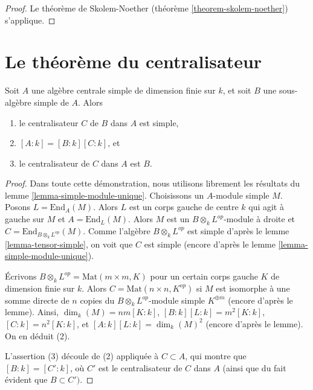 \begin{proof}
Le théorème de Skolem-Noether (théorème \ref{theorem-skolem-noether})
s'applique.
\end{proof}



\section{Le théorème du centralisateur}
\label{section-centralizer}


\begin{theorem}
\label{theorem-centralizer}
Soit $A$ une algèbre centrale simple de dimension finie sur $k$, et soit
$B$ une sous-algèbre simple de $A$. Alors
\begin{enumerate}
\item le centralisateur $C$ de $B$ dans $A$ est simple,
\item $[A : k] = [B : k][C : k]$, et
\item le centralisateur de $C$ dans $A$ est $B$.
\end{enumerate}
\end{theorem}

\begin{proof}
Dans toute cette démonstration, nous utilisons librement les résultats du
lemme \ref{lemma-simple-module-unique}.
Choisissons un $A$-module simple $M$. Posons $L = \text{End}_A(M)$.
Alors $L$ est un corps gauche de centre $k$ qui agit à gauche sur $M$
et $A = \text{End}_L(M)$.
Alors $M$ est un $B \otimes_k L^{op}$-module à droite et
$C = \text{End}_{B \otimes_k L^{op}}(M)$.
Comme l'algèbre $B \otimes_k L^{op}$ est simple d'après le
lemme \ref{lemma-tensor-simple}, on voit que $C$ est simple (encore d'après le
lemme \ref{lemma-simple-module-unique}).

\medskip\noindent
Écrivons $B \otimes_k L^{op} = \text{Mat}(m \times m, K)$ pour un certain
corps gauche $K$ de dimension finie sur $k$. Alors $C = \text{Mat}(n \times n, K^{op})$
si $M$ est isomorphe à une somme directe de $n$ copies du
$B \otimes_k L^{op}$-module simple $K^{\oplus m}$ (encore d'après le lemme). Ainsi,
$\dim_k(M) = nm [K : k]$, $[B : k] [L : k] = m^2 [K : k]$,
$[C : k] = n^2 [K : k]$, et $[A : k] [L : k] = \dim_k(M)^2$ (encore d'après
le lemme). On en déduit (2).

\medskip\noindent
L'assertion (3) découle de (2) appliquée à $C \subset A$, qui montre
que $[B : k] = [C' : k]$, où $C'$ est le centralisateur de $C$ dans $A$
(ainsi que du fait évident que $B \subset C')$.
\end{proof}


